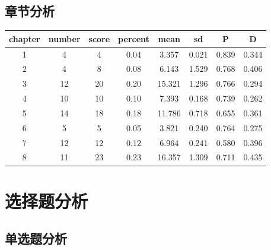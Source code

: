 \documentclass[hyperref,adobefonts]{ctexart}
\begin{document}
\subsection{章节分析}

\begin{longtable}{c|c|c|c|c|c|c|c}
\hline
chapter & number & score & percent & mean & sd & P & D\\
\hline
1 & 4 & 4 & 0.04 & 3.357 & 0.021 & 0.839 & 0.344\\
\hline
2 & 4 & 8 & 0.08 & 6.143 & 1.529 & 0.768 & 0.406\\
\hline
3 & 12 & 20 & 0.20 & 15.321 & 1.296 & 0.766 & 0.294\\
\hline
4 & 10 & 10 & 0.10 & 7.393 & 0.168 & 0.739 & 0.262\\
\hline
5 & 14 & 18 & 0.18 & 11.786 & 0.718 & 0.655 & 0.361\\
\hline
6 & 5 & 5 & 0.05 & 3.821 & 0.240 & 0.764 & 0.275\\
\hline
7 & 12 & 12 & 0.12 & 6.964 & 0.241 & 0.580 & 0.396\\
\hline
8 & 11 & 23 & 0.23 & 16.357 & 1.309 & 0.711 & 0.435\\
\hline
\end{longtable}

\section{选择题分析}

\subsection{单选题分析}
\end{document}
